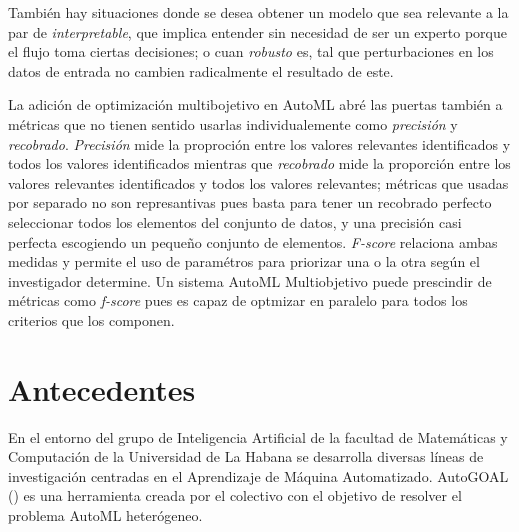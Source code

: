 Tambi\'en hay situaciones donde se desea obtener un modelo que sea relevante a la par de \textit{interpretable}, que implica entender sin necesidad de ser un experto porque el flujo toma ciertas decisiones; o cuan \textit{robusto} es, tal que perturbaciones en los datos de entrada no cambien radicalmente el resultado de este.

La adici\'on de optimizaci\'on multibojetivo en AutoML abr\'e las puertas tambi\'en a m\'etricas que no tienen sentido usarlas individualemente como \textit{precisi\'on} y \textit{recobrado}. 
 \textit{Precisi\'on} mide la proproci\'on entre los valores relevantes identificados y todos los valores identificados
 mientras que \textit{recobrado} mide la proporci\'on entre los valores relevantes identificados y todos los valores relevantes;
m\'etricas que usadas por separado no son represantivas pues basta para tener un recobrado perfecto seleccionar todos los elementos del conjunto de datos, y una precisi\'on casi perfecta escogiendo un pequeño conjunto de elementos.
\textit{F-score} relaciona ambas medidas y permite el uso de  param\'etros para priorizar una o la otra seg\'un el investigador determine. 
Un sistema AutoML Multiobjetivo puede prescindir de m\'etricas como \textit{f-score} pues es capaz de optmizar en paralelo para todos los criterios que los componen.


\section*{Antecedentes}

En el entorno del grupo de Inteligencia Artificial de la facultad de Matem\'aticas y Computaci\'on de la Universidad de La Habana se desarrolla diversas l\'ineas de investigaci\'on centradas en el Aprendizaje de M\'aquina Automatizado. AutoGOAL (\cite{estevez2020solving}) es una herramienta creada por el colectivo con el objetivo de resolver el problema AutoML heter\'ogeneo.

